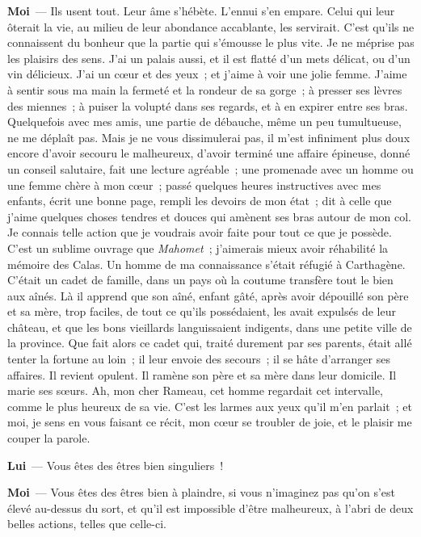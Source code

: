 \documentclass[french,twoside]{book} %
\newcommand{\labelchar}[1]{\textbf{\color{rubric} #1}}
\begin{document}
\labelchar{Moi} — Ils usent tout. Leur âme s’hébète. L’ennui s’en empare. Celui qui leur ôterait la vie, au milieu de leur abondance accablante, les servirait. C’est qu’ils ne connaissent du bonheur que la partie qui s’émousse le plus vite. Je ne méprise pas les plaisirs des sens. J’ai un palais aussi, et il est flatté d’un mets délicat, ou d’un vin délicieux. J’ai un cœur et des yeux ; et j’aime à voir une jolie femme. J’aime à sentir sous ma main la fermeté et la rondeur de sa gorge ; à presser ses lèvres des miennes ; à puiser la volupté dans ses regards, et à en expirer entre ses bras. Quelquefois avec mes amis, une partie de débauche, même un peu tumultueuse, ne me déplaît pas. Mais je ne vous dissimulerai pas, il m’est infiniment plus doux encore d’avoir secouru le malheureux, d’avoir terminé une affaire épineuse, donné un conseil salutaire, fait une lecture agréable ; une promenade avec un homme ou une femme chère à mon cœur ; passé quelques heures instructives avec mes enfants, écrit une bonne page, rempli les devoirs de mon état ; dit à celle que j’aime quelques choses tendres et douces qui amènent ses bras autour de mon col. Je connais telle action que je voudrais avoir faite pour tout ce que je possède. C’est un sublime ouvrage que \emph{Mahomet} ; j’aimerais mieux avoir réhabilité la mémoire des Calas. Un homme de ma connaissance s’était réfugié à Carthagène. C’était un cadet de famille, dans un pays où la coutume transfère tout le bien aux aînés. Là il apprend que son aîné, enfant gâté, après avoir dépouillé son père et sa mère, trop faciles, de tout ce qu’ils possédaient, les avait expulsés de leur château, et que les bons vieillards languissaient indigents, dans une petite ville de la province. Que fait alors ce cadet qui, traité durement par ses parents, était allé tenter la fortune au loin ; il leur envoie des secours ; il se hâte d’arranger ses affaires. Il revient opulent. Il ramène son père et sa mère dans leur domicile. Il marie ses sœurs. Ah, mon cher Rameau, cet homme regardait cet intervalle, comme le plus heureux de sa vie. C’est les larmes aux yeux qu’il m’en parlait ; et moi, je sens en vous faisant ce récit, mon cœur se troubler de joie, et le plaisir me couper la parole.\par
\labelchar{Lui} — Vous êtes des êtres bien singuliers !\par
\labelchar{Moi} — Vous êtes des êtres bien à plaindre, si vous n’imaginez pas qu’on s’est élevé au-dessus du sort, et qu’il est impossible d’être malheureux, à l’abri de deux belles actions, telles que celle-ci.\par
\end{document}
